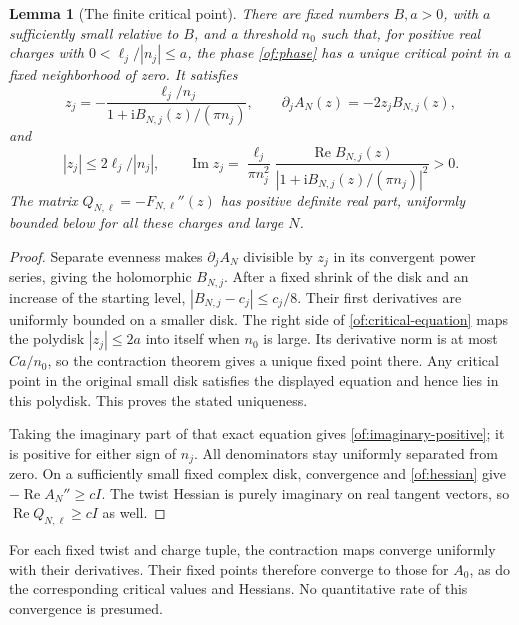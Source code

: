 \documentclass[11pt]{article}
\numberwithin{equation}{section}
\newtheorem{lemma}[theorem]{Lemma}
\theoremstyle{definition}\newtheorem{definition}[theorem]{Definition}
\theoremstyle{remark}\newtheorem{remark}[theorem]{Remark}
\newcommand{\ii}{\mathrm i}
\newcommand{\Rea}{\operatorname{Re}}
\newcommand{\Ima}{\operatorname{Im}}
\begin{document}
\begin{lemma}[The finite critical point]\label{of:critical}
There are fixed numbers $B,a>0$, with $a$ sufficiently small relative
to $B$, and a threshold $n_0$ such that, for positive real charges with
$0<\ell_j/|n_j|\le a$, the phase \eqref{of:phase} has a unique critical
point in a fixed neighborhood of zero. It satisfies
\begin{equation}\label{of:critical-equation}
 z_j=-\frac{\ell_j/n_j}{1+\ii B_{N,j}(z)/(\pi n_j)},\qquad
 \partial_jA_N(z)=-2z_jB_{N,j}(z),
\end{equation}
and
\begin{equation}\label{of:imaginary-positive}
 |z_j|\le2\ell_j/|n_j|,\qquad
 \Ima z_j=\frac{\ell_j}{\pi n_j^2}
     \frac{\Rea B_{N,j}(z)}{|1+\ii B_{N,j}(z)/(\pi n_j)|^2}>0.
\end{equation}
The matrix $Q_{N,\ell}=-F_{N,\ell}''(z)$ has positive definite real
part, uniformly bounded below for all these charges and large $N$.
\end{lemma}
\begin{proof}
Separate evenness makes $\partial_jA_N$ divisible by $z_j$ in its
convergent power series, giving the holomorphic $B_{N,j}$. After a
fixed shrink of the disk and an increase of the starting level,
$|B_{N,j}-c_j|\le c_j/8$. Their first derivatives are uniformly
bounded on a smaller disk. The right side of
\eqref{of:critical-equation} maps the polydisk $|z_j|\le2a$ into
itself when $n_0$ is large. Its derivative norm is at most
$C a/n_0$, so the contraction theorem gives a unique fixed point
there. Any critical point in the original small disk satisfies the
displayed equation and hence lies in this polydisk. This proves the
stated uniqueness.

Taking the imaginary part of that exact equation gives
\eqref{of:imaginary-positive}; it is positive for either sign of
$n_j$. All denominators stay uniformly separated from zero.
On a sufficiently small fixed complex disk, convergence and
\eqref{of:hessian} give
$-\Rea A_N''\ge cI$. The twist Hessian is purely imaginary on
real tangent vectors, so $\Rea Q_{N,\ell}\ge cI$ as well.
\end{proof}

For each fixed twist and charge tuple, the contraction maps converge
uniformly with their derivatives. Their fixed points therefore converge
to those for $A_0$, as do the corresponding critical values and Hessians.
No quantitative rate of this convergence is presumed.
\end{document}
